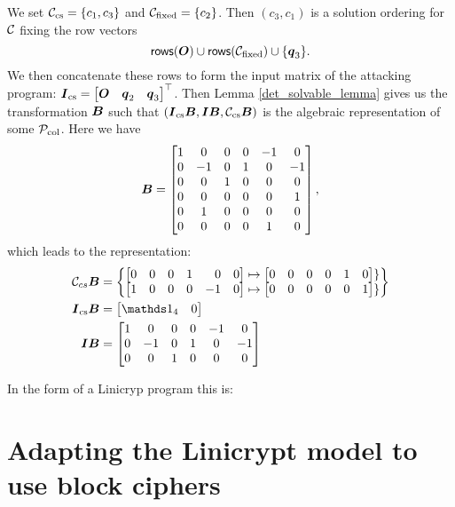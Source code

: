 We set $\Ccs = \{ c_1, c_3 \}$ and $\Cfix = \{c_2\}$.
Then $(c_3, c_1)$ is a solution ordering for $\C$ fixing the row vectors
\[
\rows(\O) \cup \rows(\Cfix) \cup \{ \vq_3 \}.
\]
We then concatenate these rows to form the input matrix of the attacking program:
$\I_\textrm{cs} = \begin{bmatrix}\O & \vq_2 & \vq_3 \end{bmatrix}^\top$.
Then Lemma \ref{det_solvable_lemma} gives us the transformation $\B$
such that $(\I_\textrm{cs} \B, \I \B, \Ccs \B)$
is the algebraic representation of some $\P_\textrm{col}$.
Here we have
\[
\B = 
\begin{bmatrix}
1 & 0 & 0 & 0 &-1 & 0 \\
0 &-1 & 0 & 1 & 0 &-1 \\
0 & 0 & 1 & 0 & 0 & 0 \\
0 & 0 & 0 & 0 & 0 & 1 \\
0 & 1 & 0 & 0 & 0 & 0 \\
0 & 0 & 0 & 0 & 1 & 0
\end{bmatrix},
\]
which leads to the representation:
\begin{align*}
    \C_{cs} \B &= \begin{Bmatrix}
        \m{0 & 0 & 0 & 1 &\phantom{-}0 & 0} \mapsto \m{0 & 0 & 0 & 0 & 1 & 0} \} \\
        \m{1 & 0 & 0 & 0 &-1 & 0} \mapsto \m{0 & 0 & 0 & 0 & 0 & 1} \}
    \end{Bmatrix} \\
    \I_\textrm{cs} \B &= \m{\Id_4 & 0} \\
    \I \B &= \begin{bmatrix}
1 & 0 & 0 & 0 &-1 & 0 \\
0 &-1 & 0 & 1 & 0 &-1 \\
0 & 0 & 1 & 0 & 0 & 0
    \end{bmatrix}    
\end{align*}

In the form of a Linicryp program this is:


\section{Adapting the Linicrypt model to use block ciphers}

